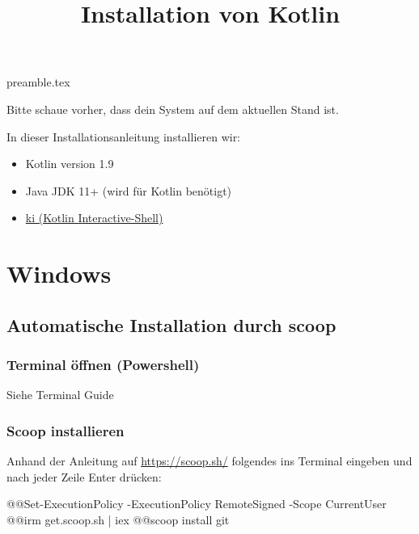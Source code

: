 \RequirePackage{import}
{preamble.tex}
\usepackage{hyperref}
\title{Installation von Kotlin}


\maketitle

Bitte schaue vorher, dass dein System auf dem aktuellen Stand ist.

In dieser Installationsanleitung installieren wir:
\begin{itemize}
    \item Kotlin version 1.9
    \item Java JDK 11+ (wird für Kotlin benötigt)
    \item \href{https://github.com/Kotlin/kotlin-interactive-shell}{ki (\underline{K}otlin \underline{I}nteractive-Shell)}
\end{itemize}
\section*{Windows}
\subsection*{Automatische Installation durch scoop}
\subsubsection*{Terminal öffnen (Powershell)}
Siehe Terminal Guide
\subsubsection*{Scoop installieren}
Anhand der Anleitung auf \url{https://scoop.sh/} folgendes ins Terminal eingeben und nach jeder Zeile Enter drücken:
\begin{commandshell}
@\shellprefix{}@Set-ExecutionPolicy -ExecutionPolicy RemoteSigned -Scope CurrentUser
@\shellprefix{}@irm get.scoop.sh | iex
@\shellprefix{}@scoop install git
\end{commandshell}

